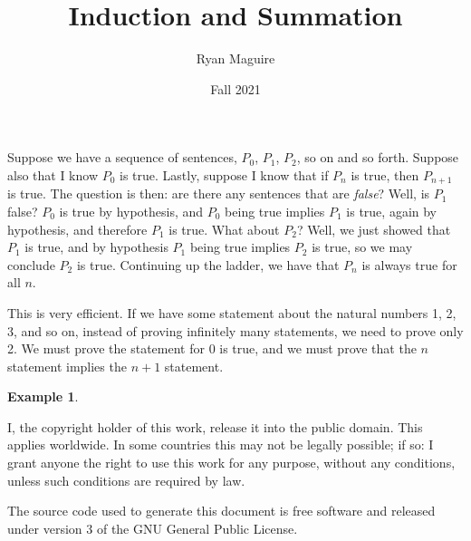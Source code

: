 \documentclass{article}
\title{Induction and Summation}
\author{Ryan Maguire}
\date{Fall 2021}
\theoremstyle{normal}
\newtheorem{example}{Example}
\theoremstyle{plain}
\begin{document}
    \maketitle
    Suppose we have a sequence of sentences, $P_{0}$, $P_{1}$, $P_{2}$, so on
    and so forth. Suppose also that I know $P_{0}$ is true. Lastly, suppose I
    know that if $P_{n}$ is true, then $P_{n+1}$ is true. The question is then:
    are there any sentences that are \textit{false}? Well, is $P_{1}$ false?
    $P_{0}$ is true by hypothesis, and $P_{0}$ being true implies $P_{1}$ is
    true, again by hypothesis, and therefore $P_{1}$ is true. What about
    $P_{2}$? Well, we just showed that $P_{1}$ is true, and by hypothesis
    $P_{1}$ being true implies $P_{2}$ is true, so we may conclude $P_{2}$ is
    true. Continuing up the ladder, we have that $P_{n}$ is always
    true for all $n$.
    \par\hfill\par
    This is very efficient. If we have some statement about the natural numbers
    1, 2, 3, and so on, instead of proving infinitely many statements, we need
    to prove only 2. We must prove the statement for 0 is true, and we must
    prove that the $n$ statement implies the $n+1$ statement.
    \begin{example}

    \end{example}
    \newpage
    I, the copyright holder of this work, release it into the public domain.
    This applies worldwide. In some countries this may not be legally possible;
    if so: I grant anyone the right to use this work for any purpose, without
    any conditions, unless such conditions are required by law.
    \par\hfill\par
    The source code used to generate this document is free software and released
    under version 3 of the GNU General Public License.
\end{document}
